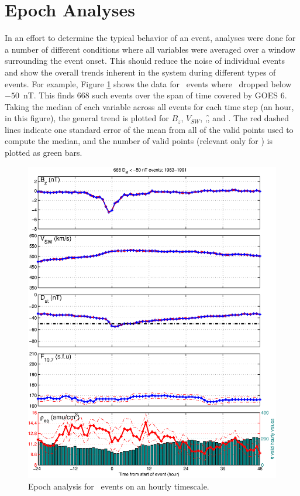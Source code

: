 \section{Epoch Analyses}
In an effort to determine the typical behavior of an event, analyses were done for a number of different conditions where all variables were averaged over a window surrounding the event onset. This should reduce the noise of individual events and show the overall trends inherent in the system during different types of events. For example, Figure \ref{fig:EpochDst} shows the data for \dst\ events where \dst\ dropped below $-50$~nT. This finds 668 such events over the span of time covered by GOES 6. Taking the median of each variable across all events for each time step (an hour, in this figure), the general trend is plotted for $B_z$, $V_{SW}$, \dst,\f, and \req. The red dashed lines indicate one standard error of the mean from all of the valid points used to compute the median, and the number of valid points (relevant only for \req) is plotted as green bars.

\begin{figure}[htp!]
	\centering
	\includegraphics[width=1\linewidth]{Figures/StormAvs/stormavs-dst}
	\caption{Epoch analysis for \dst\ events on an hourly timescale.}
	\label{fig:EpochDst}
\end{figure}

